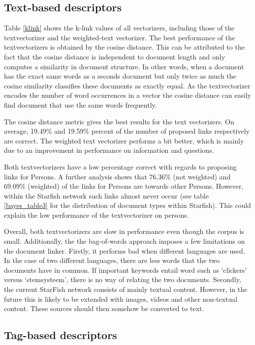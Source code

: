 \subsection{Text-based descriptors}
Table \ref{klink} shows the k-link values of all vectorizers, including those of the textvectorizer and the weighted-text vectorizer. The best performance of the textvectorizers is obtained by the cosine distance. This can be attributed
 to the fact that the cosine distance is independent to document length and only
 computes a similarity in document structure. In other words, when a document
 has the exact same words as a seconds document but only twice as much the
 cosine similarity classifies these documents as exactly equal. As the textvectorizer
 encodes the number of word occurrences in a vector the cosine distance can 
 easily find document that use the same words frequently.

The cosine distance metric gives the best results for the text vectorizers. On average, 19.49\% and 19.59\% percent of the number of proposed links respectively are correct. The weighted text vectorizer performs a bit better, which is mainly due to an improvement in performance on information and questions.

Both textvectorizers have a low percentage correct with regards to proposing links for Persons. A further analysis shows that 76.36\% (not weighted) and 69.09\% (weighted) of the links for Persons are towards other Persons. However, within the Starfish network such links almost never occur (see table \ref{bayes_table3} for the distribution of document types within Starfish). This could explain the low performance of the textvectorizer on persons. 

Overall, both textvectorizers are slow in performance even though the corpus is small. Additionally, the the bag-of-words approach imposes a few limitations on the document linker. Firstly, it performs bad when different languages are used. In the case of two different languages, there are less words that the two documents have in common. If important keywords entail word such as `clickers' versus `stemsysteem', there is no way of relating the two documents. Secondly, the current StarFish network consists of mainly textual content. However, in the future this is likely to be extended with images, videos and other non-textual content. These sources should then somehow be converted to text.

\subsection{Tag-based descriptors}

